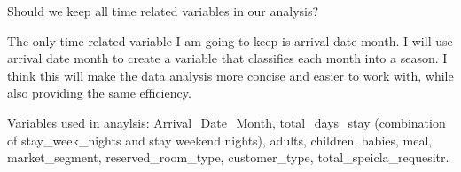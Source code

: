\documentclass[]{article}
\newenvironment{Shaded}{\begin{snugshade}}{\end{snugshade}}
\newcommand{\CommentTok}[1]{\textcolor[rgb]{0.56,0.35,0.01}{\textit{#1}}}
\newcommand{\ControlFlowTok}[1]{\textcolor[rgb]{0.13,0.29,0.53}{\textbf{#1}}}
\newcommand{\DecValTok}[1]{\textcolor[rgb]{0.00,0.00,0.81}{#1}}
\newcommand{\NormalTok}[1]{#1}
\newcommand{\OperatorTok}[1]{\textcolor[rgb]{0.81,0.36,0.00}{\textbf{#1}}}
\newcommand{\StringTok}[1]{\textcolor[rgb]{0.31,0.60,0.02}{#1}}
\begin{document}
Should we keep all time related variables in our analysis?

The only time related variable I am going to keep is arrival date month.
I will use arrival date month to create a variable that classifies each
month into a season. I think this will make the data analysis more
concise and easier to work with, while also providing the same
efficiency.

Variables used in anaylsis: Arrival\_Date\_Month, total\_days\_stay
(combination of stay\_week\_nights and stay weekend nights), adults,
children, babies, meal, market\_segment, reserved\_room\_type,
customer\_type, total\_speicla\_requesitr.

\begin{Shaded}
\end{Shaded}
\end{document}
